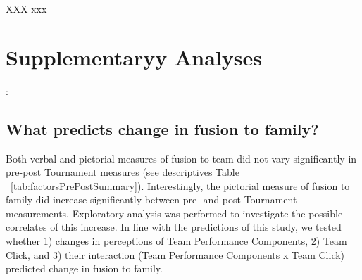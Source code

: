 {            



























































XXX
xxx






 \section{Supplementaryy Analyses}:

 \subsection{What predicts change in fusion to family?}
 Both verbal and pictorial measures of fusion to team did not vary significantly in pre-post Tournament measures (see descriptives Table ~\ref{tab:factorsPrePostSummary}).  Interestingly, the pictorial measure of fusion to family did increase significantly between pre- and post-Tournament measurements.  Exploratory analysis was performed to investigate the possible correlates of this increase. In line with the predictions of this study, we tested whether 1) changes in perceptions of Team Performance Components, 2) Team Click, and 3) their interaction (Team Performance Components x Team Click) predicted change in fusion to family.

}
